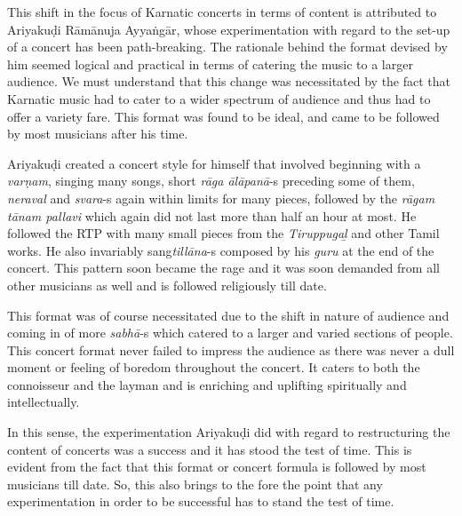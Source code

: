 This shift in the focus of Karnatic concerts in terms of content is attributed to Ariyakuḍi Rāmānuja Ayyaṅgār, whose experimentation with regard to the set-up of a concert has been path-breaking. The rationale behind the format devised by him seemed logical and practical in terms of catering the music to a larger audience. We must understand that this change was necessitated by the fact that Karnatic music had to cater to a wider spectrum of audience and thus had to offer a variety fare. This format was found to be ideal, and came to be followed by most musicians after his time.

Ariyakuḍi created a concert style for himself that involved beginning with a \textit{varṇam}, singing many songs, short \textit{rāga ālāpanā}-s preceding some of them, \textit{neraval} and \textit{svara}-s again within limits for many pieces, followed by the \textit{rāgam tānam pallavi} which again did not last more than half an hour at most. He followed the RTP with many small pieces from the \textit{Tiruppugaḻ} and other Tamil works. He also invariably sang\break \textit{tillāna}-s composed by his \textit{guru} at the end of the concert. This pattern soon became the rage and it was soon demanded from all other musicians as well and is followed religiously till date.

This format was of course necessitated due to the shift in nature of audience and coming in of more \textit{sabhā}-s which catered to a larger and varied sections of people. This concert format never failed to impress the audience as there was never a dull moment or feeling of boredom throughout the concert. It caters to both the connoisseur and the layman and is enriching and uplifting spiritually and intellectually. 

In this sense, the experimentation Ariyakuḍi did with regard to restructuring the content of concerts was a success and it has stood the test of time. This is evident from the fact that this format or concert formula is followed by most musicians till date. So, this also brings to the fore the point that any experimentation in order to be successful has to stand the test of time.

